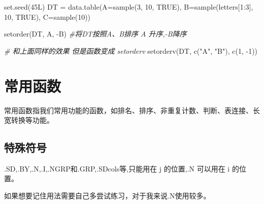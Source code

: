 \documentclass[
]{book}
\newenvironment{Shaded}{\begin{snugshade}}{\end{snugshade}}
\newcommand{\AttributeTok}[1]{\textcolor[rgb]{0.77,0.63,0.00}{#1}}
\newcommand{\CommentTok}[1]{\textcolor[rgb]{0.56,0.35,0.01}{\textit{#1}}}
\newcommand{\ConstantTok}[1]{\textcolor[rgb]{0.00,0.00,0.00}{#1}}
\newcommand{\DecValTok}[1]{\textcolor[rgb]{0.00,0.00,0.81}{#1}}
\newcommand{\FunctionTok}[1]{\textcolor[rgb]{0.00,0.00,0.00}{#1}}
\newcommand{\NormalTok}[1]{#1}
\newcommand{\OtherTok}[1]{\textcolor[rgb]{0.56,0.35,0.01}{#1}}
\newcommand{\SpecialCharTok}[1]{\textcolor[rgb]{0.00,0.00,0.00}{#1}}
\newcommand{\StringTok}[1]{\textcolor[rgb]{0.31,0.60,0.02}{#1}}
\begin{document}
\begin{Shaded}
\begin{Highlighting}[]
\FunctionTok{set.seed}\NormalTok{(45L)}
\NormalTok{DT }\OtherTok{=} \FunctionTok{data.table}\NormalTok{(}\AttributeTok{A=}\FunctionTok{sample}\NormalTok{(}\DecValTok{3}\NormalTok{, }\DecValTok{10}\NormalTok{, }\ConstantTok{TRUE}\NormalTok{),}
         \AttributeTok{B=}\FunctionTok{sample}\NormalTok{(letters[}\DecValTok{1}\SpecialCharTok{:}\DecValTok{3}\NormalTok{], }\DecValTok{10}\NormalTok{, }\ConstantTok{TRUE}\NormalTok{), }\AttributeTok{C=}\FunctionTok{sample}\NormalTok{(}\DecValTok{10}\NormalTok{))}

\FunctionTok{setorder}\NormalTok{(DT, A, }\SpecialCharTok{{-}}\NormalTok{B) }\CommentTok{\#将DT按照A、B排序 A 升序,{-}B降序}

\CommentTok{\# 和上面同样的效果 但是函数变成 setorderv}
\FunctionTok{setorderv}\NormalTok{(DT, }\FunctionTok{c}\NormalTok{(}\StringTok{"A"}\NormalTok{, }\StringTok{"B"}\NormalTok{), }\FunctionTok{c}\NormalTok{(}\DecValTok{1}\NormalTok{, }\SpecialCharTok{{-}}\DecValTok{1}\NormalTok{))}
\end{Highlighting}
\end{Shaded}

\hypertarget{ux5e38ux7528ux51fdux6570-1}{%
\section{常用函数}\label{ux5e38ux7528ux51fdux6570-1}}

常用函数指我们常用功能的函数，如排名、排序、非重复计数、判断、表连接、长宽转换等功能。

\hypertarget{ux7279ux6b8aux7b26ux53f7}{%
\subsection{特殊符号}\label{ux7279ux6b8aux7b26ux53f7}}

.SD,.BY,.N,.I,.NGRP和.GRP,.SDcols等,只能用在 j 的位置,.N 可以用在 i 的位置。

如果想要记住用法需要自己多尝试练习，对于我来说.N使用较多。
\end{document}
